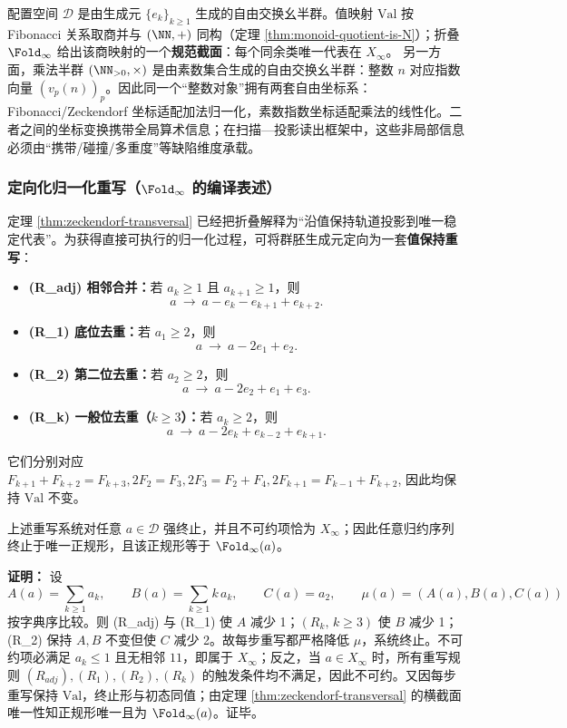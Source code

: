 \begin{remark}[两套自由交换幺半群坐标与规范截面]\label{rem:two-coordinate-monoids}
配置空间 $\mathcal{D}$ 是由生成元 $\{e_k\}_{k\ge 1}$ 生成的自由交换幺半群。值映射 $\mathrm{Val}$ 按 Fibonacci 关系取商并与 $(\NN,+)$ 同构（定理 \ref{thm:monoid-quotient-is-N}）；折叠 $\Fold_\infty$ 给出该商映射的一个\textbf{规范截面}：每个同余类唯一代表在 $X_\infty$。
另一方面，乘法半群 $(\NN_{>0},\times)$ 是由素数集合生成的自由交换幺半群：整数 $n$ 对应指数向量 $(v_p(n))_p$。因此同一个“整数对象”拥有两套自由坐标系：Fibonacci/Zeckendorf 坐标适配加法归一化，素数指数坐标适配乘法的线性化。二者之间的坐标变换携带全局算术信息；在扫描—投影读出框架中，这些非局部信息必须由“携带/碰撞/多重度”等缺陷维度承载。
\end{remark}

\subsubsection{定向化归一化重写（\texorpdfstring{$\Fold_\infty$}{Fold\_infty} 的编译表述）}\label{subsec:directed-rewrite}
定理 \ref{thm:zeckendorf-transversal} 已经把折叠解释为“沿值保持轨道投影到唯一稳定代表”。为获得直接可执行的归一化过程，可将群胚生成元定向为一套\textbf{值保持重写}：
\begin{itemize}
  \item \textbf{(R\_adj) 相邻合并：}若 $a_k\ge 1$ 且 $a_{k+1}\ge 1$，则
  \[
  a\ \to\ a-e_k-e_{k+1}+e_{k+2}.
  \]
  \item \textbf{(R\_1) 底位去重：}若 $a_1\ge 2$，则
  \[
  a\ \to\ a-2e_1+e_2.
  \]
  \item \textbf{(R\_2) 第二位去重：}若 $a_2\ge 2$，则
  \[
  a\ \to\ a-2e_2+e_1+e_3.
  \]
  \item \textbf{(R\_k) 一般位去重（$k\ge 3$）：}若 $a_k\ge 2$，则
  \[
  a\ \to\ a-2e_k+e_{k-2}+e_{k+1}.
  \]
\end{itemize}
它们分别对应
\(
F_{k+1}+F_{k+2}=F_{k+3},
2F_2=F_3,
2F_3=F_2+F_4,
2F_{k+1}=F_{k-1}+F_{k+2}
\),
因此均保持 $\mathrm{Val}$ 不变。

\begin{proposition}[终止性与唯一正规形]\label{prop:directed-rewrite-termination}
上述重写系统对任意 $a\in\mathcal{D}$ 强终止，并且不可约项恰为 $X_\infty$；因此任意归约序列终止于唯一正规形，且该正规形等于 $\Fold_\infty(a)$。
\end{proposition}

\textbf{证明：}
设
\[
A(a)=\sum_{k\ge 1} a_k,\qquad
B(a)=\sum_{k\ge 1} k\,a_k,\qquad
C(a)=a_2,
\qquad
\mu(a)=(A(a),B(a),C(a))
\]
按字典序比较。则 (R\_adj) 与 (R\_1) 使 $A$ 减少 1；$(R_k,\,k\ge 3)$ 使 $B$ 减少 1；(R\_2) 保持 $A,B$ 不变但使 $C$ 减少 2。故每步重写都严格降低 $\mu$，系统终止。不可约项必满足 $a_k\le 1$ 且无相邻 $11$，即属于 $X_\infty$；反之，当 $a\in X_\infty$ 时，所有重写规则 $(R_{adj}),(R_1),(R_2),(R_k)$ 的触发条件均不满足，因此不可约。又因每步重写保持 $\mathrm{Val}$，终止形与初态同值；由定理 \ref{thm:zeckendorf-transversal} 的横截面唯一性知正规形唯一且为 $\Fold_\infty(a)$。证毕。

